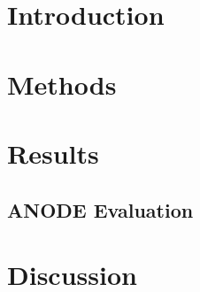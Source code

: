 \documentclass[a4paper, 10pt, english, onecolumn]{article}
\title{\fontfamily{phv}\selectfont{Another ad-hoc CAD system}}
\author{
  \textbf{W. Kanters} - \href{mailto:kantersw@gmail.com}{kantersw@gmail.com} \\
  \textbf{T. de Ruijter} - \href{mailto:t.deruijter@student.ru.nl}{t.deruijter@student.ru.nl}\\
}
\date{\fontfamily{ptm}\selectfont{\small{\bfseries{\today - Radboud
Universiteit Nijmegen}}}\\[0.5cm]\rule{\linewidth}{0.3mm}}
\begin{document}
\maketitle

\setlength{\parindent}{0.0cm}
\setlength{\parskip}{0.25cm}

\section{Introduction}

\section{Methods}

\section{Results}

\subsection{ANODE Evaluation}

\section{Discussion}

{}

\end{document}
